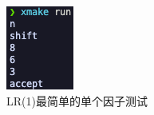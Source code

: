 \begin{figure}[htbp]
    \centering
    \begin{minipage}[t]{0.2\textwidth}
        \centering
        \includegraphics[width=\textwidth]{images/lr_1.png}
        \caption{LR(1)最简单的单个因子测试}
        \label{fig:lr-1}
    \end{minipage}
    \begin{minipage}[t]{0.2\textwidth}
        \centering

\end{minipage}
\end{figure}
